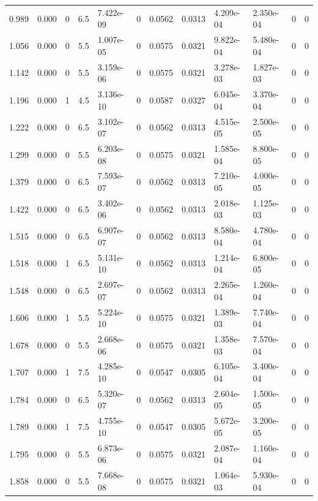 \documentclass[preview]{standalone}
\begin{document}
{{\begin{tabular}{L{1.2cm}C{1.2cm} C{0.3cm}C{0.5cm} C{1.4cm}C{1.4cm} C{1.4cm}C{1.4cm} C{1.6cm}C{1.6cm} C{1.6cm}C{1.6cm}}
  0.989  &  0.000  & 0     & 6.5 &  7.422e-09  & 0  &  0.0562&   0.0313& 4.209e-04 & 2.350e-04   &  0 & 0  \\ 
  1.056  &  0.000  & 0     & 5.5 &  1.007e-05  & 0  &  0.0575&   0.0321& 9.822e-04 & 5.480e-04   &  0 & 0  \\ 
  1.142  &  0.000  & 0     & 5.5 &  3.159e-06  & 0  &  0.0575&   0.0321& 3.278e-03 & 1.827e-03   &  0 & 0  \\ 
  1.196  &  0.000  & 1     & 4.5 &  3.136e-10  & 0  &  0.0587&   0.0327& 6.045e-04 & 3.370e-04   &  0 & 0  \\ 
  1.222  &  0.000  & 0     & 6.5 &  3.102e-07  & 0  &  0.0562&   0.0313& 4.515e-05 & 2.500e-05   &  0 & 0  \\ 
  1.299  &  0.000  & 0     & 5.5 &  6.203e-08  & 0  &  0.0575&   0.0321& 1.585e-04 & 8.800e-05   &  0 & 0  \\ 
  1.379  &  0.000  & 0     & 6.5 &  7.593e-07  & 0  &  0.0562&   0.0313& 7.210e-05 & 4.000e-05   &  0 & 0  \\ 
  1.422  &  0.000  & 0     & 6.5 &  3.402e-06  & 0  &  0.0562&   0.0313& 2.018e-03 & 1.125e-03   &  0 & 0  \\ 
  1.515  &  0.000  & 0     & 6.5 &  6.907e-07  & 0  &  0.0562&   0.0313& 8.580e-04 & 4.780e-04   &  0 & 0  \\ 
  1.518  &  0.000  & 1     & 6.5 &  5.131e-10  & 0  &  0.0562&   0.0313& 1.214e-04 & 6.800e-05   &  0 & 0  \\ 
  1.548  &  0.000  & 0     & 6.5 &  2.697e-07  & 0  &  0.0562&   0.0313& 2.265e-04 & 1.260e-04   &  0 & 0  \\ 
  1.606  &  0.000  & 1     & 5.5 &  5.224e-10  & 0  &  0.0575&   0.0321& 1.389e-03 & 7.740e-04   &  0 & 0  \\ 
  1.678  &  0.000  & 0     & 5.5 &  2.668e-06  & 0  &  0.0575&   0.0321& 1.358e-03 & 7.570e-04   &  0 & 0  \\ 
  1.707  &  0.000  & 1     & 7.5 &  4.285e-10  & 0  &  0.0547&   0.0305& 6.105e-04 & 3.400e-04   &  0 & 0  \\ 
  1.784  &  0.000  & 0     & 6.5 &  5.320e-07  & 0  &  0.0562&   0.0313& 2.604e-05 & 1.500e-05   &  0 & 0  \\ 
  1.789  &  0.000  & 1     & 7.5 &  4.755e-10  & 0  &  0.0547&   0.0305& 5.672e-05 & 3.200e-05   &  0 & 0  \\ 
  1.795  &  0.000  & 0     & 5.5 &  6.873e-06  & 0  &  0.0575&   0.0321& 2.087e-04 & 1.160e-04   &  0 & 0  \\ 
  1.858  &  0.000  & 0     & 5.5 &  7.668e-08  & 0  &  0.0575&   0.0321& 1.064e-03 & 5.930e-04   &  0 & 0  \\ 

\end{tabular}}}
\end{document}
